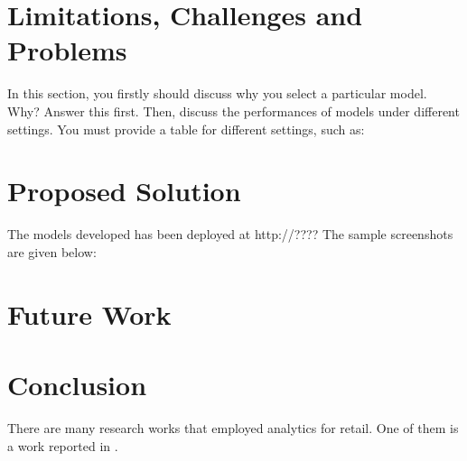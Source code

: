 \documentclass[12pt,a4paper,oneside]{article}
\begin{document}
\section{Limitations, Challenges and Problems}

In this section, you firstly should discuss why you select a particular model. Why? Answer this first. Then, discuss the performances of models under different settings. You must provide a table for different settings, such as:


\section{Proposed Solution}

The models developed has been deployed at http://????
The sample screenshots are given below:

\section{Future Work}
\section{Conclusion}
There are many research works that employed
analytics for retail. One of them is a work
reported in \cite{DBLP:journals/corr/abs-1905-12516}.


{}
\end{document}
